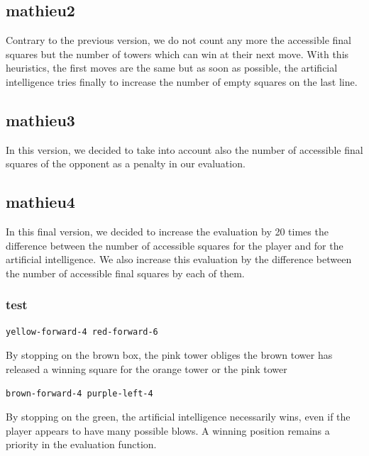 \documentclass[a4paper, 11pt]{article}
\begin{document}
\subsection{mathieu2}
Contrary to the previous version, we do not count any more the accessible final squares but the number of towers which can win at their next move. 
With this heuristics, the first moves are the same but as soon as possible, the artificial intelligence tries finally to increase the number of empty squares on the last line.

\subsection{mathieu3}
In this version, we decided to take into account also the number of accessible final squares of the opponent as a penalty in our evaluation.

\subsection{mathieu4}
In this final version, we decided to increase the evaluation by 20 times the difference between the number of accessible squares for the player and for the artificial intelligence. We also increase this evaluation by the difference between the number of accessible final squares by each of them.

\subsubsection{test}
\begin{verbatim}
yellow-forward-4 red-forward-6
\end{verbatim}
By stopping on the brown box, the pink tower obliges the brown tower has released a winning square for the orange tower or the pink tower
\begin{verbatim}
brown-forward-4 purple-left-4
\end{verbatim}
By stopping on the green, the artificial intelligence necessarily wins, even if the player appears to have many possible blows. A winning position remains a priority in the evaluation function.
\end{document}
